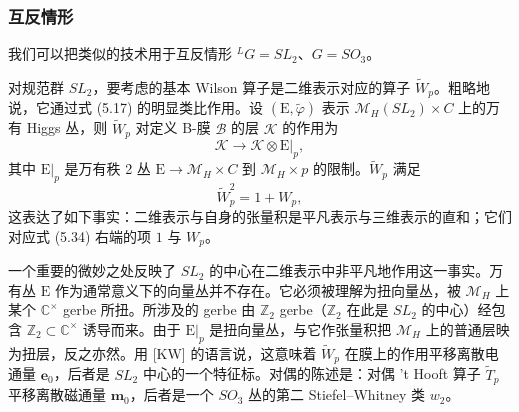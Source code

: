 \documentclass[11pt,a4paper]{article}
\begin{document}

\subsubsection{互反情形}

我们可以把类似的技术用于互反情形 ${}^{L}G=SL_2$、$G=SO_3$。

对规范群 $SL_2$，要考虑的基本 Wilson 算子是二维表示对应的算子 $\widetilde{W}_p$。粗略地说，它通过式 (5.17) 的明显类比作用。设 $(\mathrm{E},\widetilde{\varphi})$ 表示 $\mathcal{M}_H(SL_2)\times C$ 上的万有 Higgs 丛，则 $\widetilde{W}_p$ 对定义 B-膜 $\mathcal{B}$ 的层 $\mathcal{K}$ 的作用为
\begin{equation}\tag{5.33}
\mathcal{K}\to\mathcal{K}\otimes\mathrm{E}|_p,
\end{equation}
其中 $\mathrm{E}|_p$ 是万有秩 2 丛 $\mathrm{E}\to\mathcal{M}_H\times C$ 到 $\mathcal{M}_H\times p$ 的限制。$\widetilde{W}_p$ 满足
\begin{equation}\tag{5.34}
\widetilde{W}_p^2=1+W_p,
\end{equation}
这表达了如下事实：二维表示与自身的张量积是平凡表示与三维表示的直和；它们对应式 (5.34) 右端的项 $1$ 与 $W_p$。

一个重要的微妙之处反映了 $SL_2$ 的中心在二维表示中非平凡地作用这一事实。万有丛 $\mathrm{E}$ 作为通常意义下的向量丛并不存在。它必须被理解为扭向量丛，被 $\mathcal{M}_H$ 上某个 $\mathbb{C}^\times$ gerbe 所扭。所涉及的 gerbe 由 $\mathbb{Z}_2$ gerbe（$\mathbb{Z}_2$ 在此是 $SL_2$ 的中心）经包含 $\mathbb{Z}_2\subset\mathbb{C}^\times$ 诱导而来。由于 $\mathrm{E}|_p$ 是扭向量丛，与它作张量积把 $\mathcal{M}_H$ 上的普通层映为扭层，反之亦然。用 [KW] 的语言说，这意味着 $\widetilde{W}_p$ 在膜上的作用平移离散电通量 $\boldsymbol{e}_0$，后者是 $SL_2$ 中心的一个特征标。对偶的陈述是：对偶 't Hooft 算子 $\widetilde{T}_p$ 平移离散磁通量 $\boldsymbol{m}_0$，后者是一个 $SO_3$ 丛的第二 Stiefel--Whitney 类 $w_2$。

\end{document}
